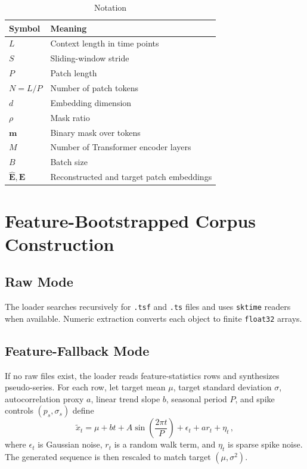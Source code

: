 \documentclass[journal]{IEEEtran}
\begin{document}
\begin{table}[t]
\caption{Notation}
\label{tab:notation}
\centering
\begin{tabular}{ll}
\toprule
Symbol & Meaning \\
\midrule
$L$ & Context length in time points \\
$S$ & Sliding-window stride \\
$P$ & Patch length \\
$N=L/P$ & Number of patch tokens \\
$d$ & Embedding dimension \\
$\rho$ & Mask ratio \\
$\mathbf{m}$ & Binary mask over tokens \\
$M$ & Number of Transformer encoder layers \\
$B$ & Batch size \\
$\hat{\mathbf{E}},\mathbf{E}$ & Reconstructed and target patch embeddings \\
\bottomrule
\end{tabular}
\end{table}

\section{Feature-Bootstrapped Corpus Construction}
\subsection{Raw Mode}
The loader searches recursively for \texttt{.tsf} and \texttt{.ts} files and uses \texttt{sktime} readers when available. Numeric extraction converts each object to finite \texttt{float32} arrays.

\subsection{Feature-Fallback Mode}
If no raw files exist, the loader reads feature-statistics rows and synthesizes pseudo-series. For each row, let target mean $\mu$, target standard deviation $\sigma$, autocorrelation proxy $a$, linear trend slope $b$, seasonal period $P$, and spike controls $(p_s,\sigma_s)$ define
\begin{equation}
\tilde{x}_t = \mu + bt + A\sin\left(\frac{2\pi t}{P}\right) + \epsilon_t + a r_t + \eta_t\,,
\label{eq:synth}
\end{equation}
where $\epsilon_t$ is Gaussian noise, $r_t$ is a random walk term, and $\eta_t$ is sparse spike noise. The generated sequence is then rescaled to match target $(\mu,\sigma^2)$.
\end{document}
